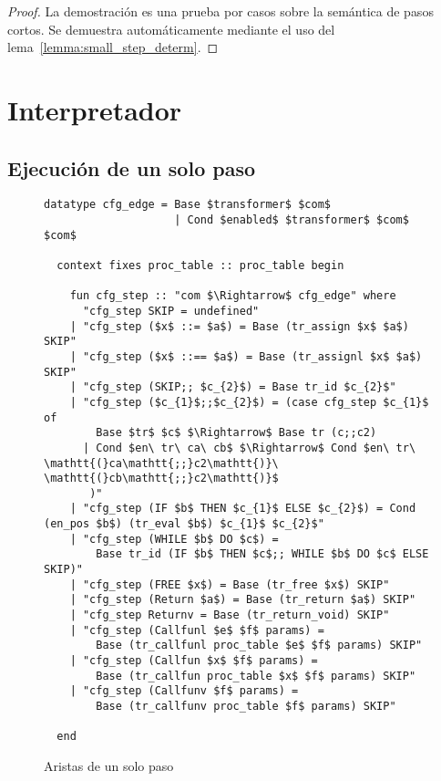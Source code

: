 \begin{proof}
La demostración es una prueba por casos sobre la semántica de pasos cortos.
Se demuestra automáticamente mediante el uso del lema~\ref{lemma:small_step_determ}.
\end{proof}


\section{Interpretador}\label{section:interpreter}

\subsection{Ejecución de un solo paso}\label{subsection:single_step}

\begin{figure}
  \begin{lstlisting}[frame=single, mathescape=true]
  datatype cfg_edge = Base $transformer$ $com$
                    | Cond $enabled$ $transformer$ $com$ $com$

  context fixes proc_table :: proc_table begin

    fun cfg_step :: "com $\Rightarrow$ cfg_edge" where
      "cfg_step SKIP = undefined"
    | "cfg_step ($x$ ::= $a$) = Base (tr_assign $x$ $a$) SKIP"
    | "cfg_step ($x$ ::== $a$) = Base (tr_assignl $x$ $a$) SKIP"
    | "cfg_step (SKIP;; $c_{2}$) = Base tr_id $c_{2}$"
    | "cfg_step ($c_{1}$;;$c_{2}$) = (case cfg_step $c_{1}$ of
        Base $tr$ $c$ $\Rightarrow$ Base tr (c;;c2)
      | Cond $en\ tr\ ca\ cb$ $\Rightarrow$ Cond $en\ tr\ \mathtt{(}ca\mathtt{;;}c2\mathtt{)}\ \mathtt{(}cb\mathtt{;;}c2\mathtt{)}$
       )"
    | "cfg_step (IF $b$ THEN $c_{1}$ ELSE $c_{2}$) = Cond (en_pos $b$) (tr_eval $b$) $c_{1}$ $c_{2}$"
    | "cfg_step (WHILE $b$ DO $c$) =
        Base tr_id (IF $b$ THEN $c$;; WHILE $b$ DO $c$ ELSE SKIP)"
    | "cfg_step (FREE $x$) = Base (tr_free $x$) SKIP"
    | "cfg_step (Return $a$) = Base (tr_return $a$) SKIP"
    | "cfg_step Returnv = Base (tr_return_void) SKIP"
    | "cfg_step (Callfunl $e$ $f$ params) =
        Base (tr_callfunl proc_table $e$ $f$ params) SKIP"
    | "cfg_step (Callfun $x$ $f$ params) =
        Base (tr_callfun proc_table $x$ $f$ params) SKIP"
    | "cfg_step (Callfunv $f$ params) =
        Base (tr_callfunv proc_table $f$ params) SKIP"

  end
  \end{lstlisting}

  \caption{Aristas de un solo paso}
  \label{fig:single_step_edges}
\end{figure}

